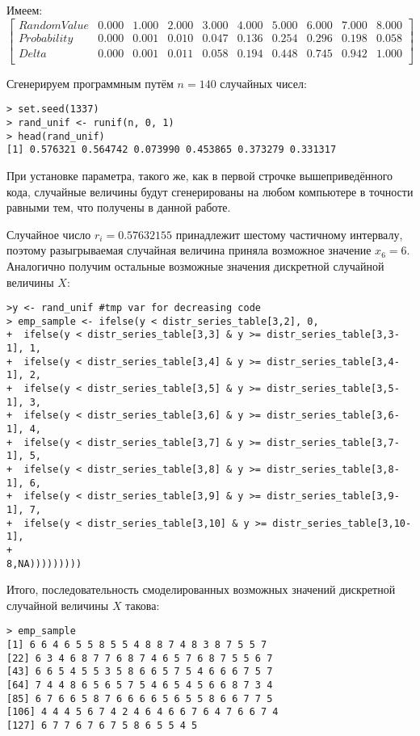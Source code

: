 \documentclass[14pt,a4paper]{scrartcl}
\begin{document}
Имеем:
\begin{equation*}
	\begin{bmatrix}{}
	Random Value & 0.000 & 1.000 & 2.000 & 3.000 & 4.000 & 5.000 & 6.000 & 7.000 & 8.000 \\ 
	Probability & 0.000 & 0.001 & 0.010 & 0.047 & 0.136 & 0.254 & 0.296 & 0.198 & 0.058 \\ 
	Delta & 0.000 & 0.001 & 0.011 & 0.058 & 0.194 & 0.448 & 0.745 & 0.942 & 1.000 \\ 
	\end{bmatrix}
\end{equation*}

Сгенерируем программным путём $n = 140$ случайных чисел:
\begin{verbatim}
> set.seed(1337)
> rand_unif <- runif(n, 0, 1)
> head(rand_unif)
[1] 0.576321 0.564742 0.073990 0.453865 0.373279 0.331317
\end{verbatim}
При установке параметра, такого же, как в первой строчке вышеприведённого кода, случайные величины будут сгенерированы на любом компьютере в точности равными тем, что получены в данной работе.

Случайное число $r_i = 0.57632155$ принадлежит шестому частичному интервалу, поэтому разыгрываемая случайная  величина приняла возможное значение $x_6 = 6$. Аналогично получим остальные возможные значения дискретной случайной величины $X$:

\begin{verbatim}
>y <- rand_unif #tmp var for decreasing code
> emp_sample <- ifelse(y < distr_series_table[3,2], 0, 
+  ifelse(y < distr_series_table[3,3] & y >= distr_series_table[3,3-1], 1, 
+  ifelse(y < distr_series_table[3,4] & y >= distr_series_table[3,4-1], 2, 
+  ifelse(y < distr_series_table[3,5] & y >= distr_series_table[3,5-1], 3, 
+  ifelse(y < distr_series_table[3,6] & y >= distr_series_table[3,6-1], 4,
+  ifelse(y < distr_series_table[3,7] & y >= distr_series_table[3,7-1], 5,
+  ifelse(y < distr_series_table[3,8] & y >= distr_series_table[3,8-1], 6,
+  ifelse(y < distr_series_table[3,9] & y >= distr_series_table[3,9-1], 7,
+  ifelse(y < distr_series_table[3,10] & y >= distr_series_table[3,10-1], 
+                                                            8,NA)))))))))
\end{verbatim}

Итого, последовательность смоделированных возможных значений дискретной случайной величины $X$ такова:
\begin{verbatim}
> emp_sample
[1] 6 6 4 6 5 5 8 5 5 4 8 8 7 4 8 3 8 7 5 5 7
[22] 6 3 4 6 8 7 7 6 8 7 4 6 5 7 6 8 7 5 5 6 7
[43] 6 6 5 4 5 5 3 5 8 6 6 5 7 5 4 6 6 6 7 5 7
[64] 7 4 4 8 6 5 6 5 7 5 4 6 5 4 5 6 6 8 7 3 4
[85] 6 7 6 6 5 8 7 6 6 6 6 5 6 5 5 8 6 6 7 7 5
[106] 4 4 4 5 6 7 4 2 4 6 4 6 6 7 6 4 7 6 6 7 4
[127] 6 7 7 6 7 6 7 5 8 6 5 5 4 5
\end{verbatim}
\end{document}
